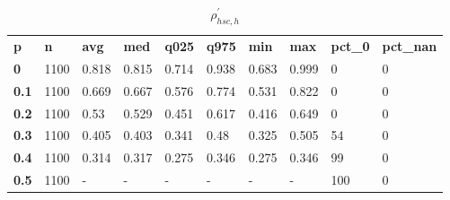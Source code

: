\begin{table}[h]
 \centering 
\footnotesize
\caption{$\rho_{hsc,h}^\prime $}
\label{tab:alphahsch}
\begin{tabular}[h]{| l l l l l l l l l l|
    } \hline
\textbf{ p} & \textbf{ n} & \textbf{ avg} & \textbf{ med} & \textbf{ q025} & \textbf{ q975} & \textbf{ min} & \textbf{ max} & \textbf{ pct\_0} & \textbf{ pct\_nan}
           \\
  \textbf{  0} & 1100 & 0.818 & 0.815 & 0.714 & 0.938 & 0.683 & 0.999 &   0 & 0
           \\
  \textbf{0.1} & 1100 & 0.669 & 0.667 & 0.576 & 0.774 & 0.531 & 0.822 &   0 & 0
           \\
  \textbf{0.2} & 1100 &  0.53 & 0.529 & 0.451 & 0.617 & 0.416 & 0.649 &   0 & 0
           \\
  \textbf{0.3} & 1100 & 0.405 & 0.403 & 0.341 &  0.48 & 0.325 & 0.505 &  54 & 0
           \\
  \textbf{0.4} & 1100 & 0.314 & 0.317 & 0.275 & 0.346 & 0.275 & 0.346 &  99 & 0
           \\
  \textbf{0.5} & 1100 & - & - & - & - & - & - & 100 & 0
           \\
 \hline \end{tabular}
 \end{table}
